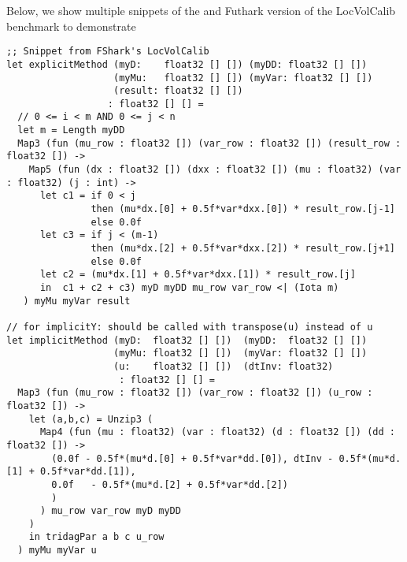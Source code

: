 Below, we show multiple snippets of the \fshark{} and Futhark version of the
LocVolCalib benchmark to demonstrate
\begin{verbatim}
;; Snippet from FShark's LocVolCalib
let explicitMethod (myD:    float32 [] []) (myDD: float32 [] [])
                   (myMu:   float32 [] []) (myVar: float32 [] [])
                   (result: float32 [] [])
                  : float32 [] [] =
  // 0 <= i < m AND 0 <= j < n
  let m = Length myDD
  Map3 (fun (mu_row : float32 []) (var_row : float32 []) (result_row : float32 []) ->
    Map5 (fun (dx : float32 []) (dxx : float32 []) (mu : float32) (var : float32) (j : int) ->
      let c1 = if 0 < j
               then (mu*dx.[0] + 0.5f*var*dxx.[0]) * result_row.[j-1]
               else 0.0f
      let c3 = if j < (m-1)
               then (mu*dx.[2] + 0.5f*var*dxx.[2]) * result_row.[j+1]
               else 0.0f
      let c2 = (mu*dx.[1] + 0.5f*var*dxx.[1]) * result_row.[j]
      in  c1 + c2 + c3) myD myDD mu_row var_row <| (Iota m)
   ) myMu myVar result

// for implicitY: should be called with transpose(u) instead of u
let implicitMethod (myD:  float32 [] [])  (myDD:  float32 [] [])
                   (myMu: float32 [] [])  (myVar: float32 [] [])
                   (u:    float32 [] [])  (dtInv: float32)
                    : float32 [] [] =
  Map3 (fun (mu_row : float32 []) (var_row : float32 []) (u_row : float32 []) ->
    let (a,b,c) = Unzip3 (
      Map4 (fun (mu : float32) (var : float32) (d : float32 []) (dd : float32 []) ->
        (0.0f - 0.5f*(mu*d.[0] + 0.5f*var*dd.[0]), dtInv - 0.5f*(mu*d.[1] + 0.5f*var*dd.[1]), 
        0.0f   - 0.5f*(mu*d.[2] + 0.5f*var*dd.[2])
        )
      ) mu_row var_row myD myDD
    )
    in tridagPar a b c u_row
  ) myMu myVar u
\end{verbatim}

